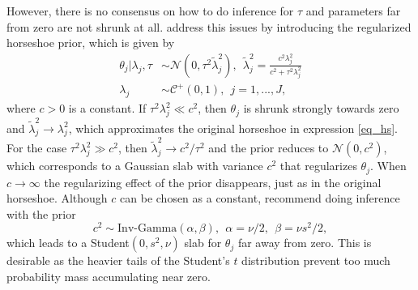 However, there is no consensus on how to do inference for $\tau$ and parameters far from zero are not shrunk at all.
\cite{piironen_sparsity_2017} address this issues by introducing the regularized horseshoe prior, which is given by
\begin{equation}
    \begin{split}
        \theta_j | \lambda_j, \tau & \sim \mathcal N (0, \tau^2 \tilde \lambda^2_j),
        ~~ \tilde \lambda_j^2 = \displaystyle \frac{c^2 \lambda^2_j}{c^2 + \tau^2 \lambda_j^2}\\
        \lambda_j & \sim \mathcal C^+ (0, 1), ~~ j = 1,..., J,
    \end{split}
\end{equation}
where $c > 0$ is a constant.
If $\tau^2\lambda^2_j \ll c^2$, then $\theta_j$ is shrunk strongly towards zero and $\tilde \lambda^2_j \rightarrow \lambda^2_j$, which approximates the original horseshoe in expression \ref{eq_hs}.
For the case $\tau^2\lambda^2_j \gg c^2$, then $\tilde \lambda^2_j \rightarrow c^2/\tau^2$ and the prior reduces to $\mathcal N(0, c^2)$, which corresponds to a Gaussian slab with variance $c^2$ that regularizes $\theta_j$.
When $c \rightarrow \infty$ the regularizing effect of the prior disappears, just as in the original horseshoe.
Although $c$ can be chosen as a constant, \cite{piironen_sparsity_2017} recommend doing inference with the prior
\begin{equation*}
    c^2 \sim \text{Inv-Gamma}(\alpha, \beta), ~~ \alpha = \nu/2, ~~ \beta = \nu s^2/2,
\end{equation*}
which leads to a Student$(0, s^2, \nu)$ slab for $\theta_j$ far away from zero.
This is desirable as the heavier tails of the Student's $t$ distribution prevent too much probability mass accumulating near zero.

